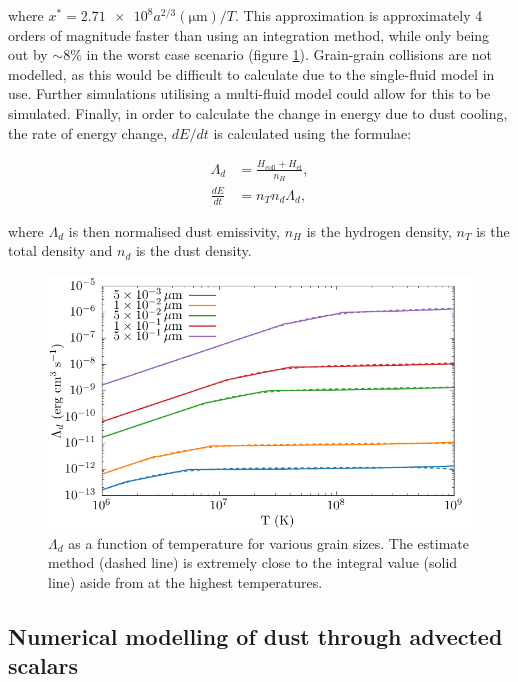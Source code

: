 \documentclass[fleqn,usenatbib]{mnras}
\begin{document}
\noindent
where $x^* = \num{2.71e8} a^{2/3} (\si{\micro\metre})/T$.
This approximation is approximately 4 orders of magnitude faster than using an integration method, while only being out by $\sim 8\%$ in the worst case scenario (figure \ref{fig:lambdacomparison}).
Grain-grain collisions are not modelled, as this would be difficult to calculate due to the single-fluid model in use.
Further simulations utilising a multi-fluid model could allow for this to be simulated.
Finally, in order to calculate the change in energy due to dust cooling, the rate of energy change, $dE/dt$ is calculated using the formulae:

\begin{subequations}
  \begin{align}
    \Lambda_d     & = \frac{H_\text{coll} + H_\text{el}}{n_H} , \\
    \frac{dE}{dt} & = n_T n_d \Lambda_d ,
  \end{align}
\end{subequations}

\noindent
where $\Lambda_d$ is then normalised dust emissivity,
$n_H$ is the hydrogen density,
$n_T$ is the total density
and $n_d$ is the dust density.

\begin{figure}
  \centering
  \includegraphics[width=\linewidth]{assets/grain-transparency/lambda-comp.pdf}
  \caption[Comparison of electron transparency methods.]{$\Lambda_d$ as a function of temperature for various grain sizes. The estimate method (dashed line) is extremely close to the integral value (solid line) aside from at the highest temperatures.}
  \label{fig:lambdacomparison}
\end{figure}

\subsection{Numerical modelling of dust through advected scalars}
\end{document}
